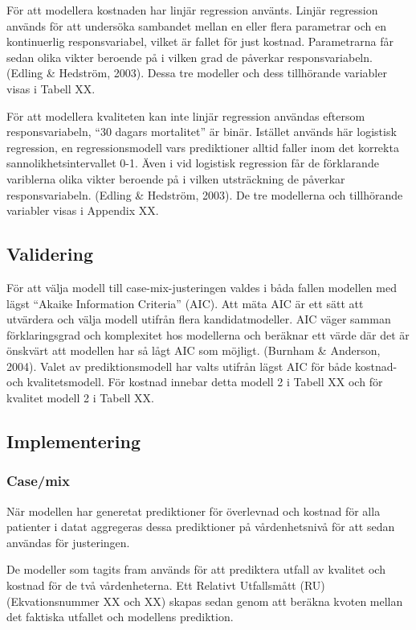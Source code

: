 För att modellera kostnaden har linjär regression använts. Linjär regression används för att undersöka sambandet mellan en eller flera parametrar och en kontinuerlig responsvariabel, vilket är fallet för just kostnad. Parametrarna får sedan olika vikter beroende på i vilken grad de påverkar responsvariabeln. (Edling \& Hedström, 2003). Dessa tre modeller och dess tillhörande variabler visas i Tabell XX.

För att modellera kvaliteten kan inte linjär regression användas eftersom responsvariabeln, “30 dagars mortalitet” är binär. Istället används här logistisk regression, en regressionsmodell vars prediktioner alltid faller inom det korrekta sannolikhetsintervallet 0-1. Även i vid logistisk regression får de förklarande variblerna olika vikter beroende på i vilken utsträckning de påverkar responsvariabeln. (Edling \& Hedström, 2003). De tre modellerna och tillhörande variabler visas i Appendix XX. 

\subsection{Validering}

För att välja modell till case-mix-justeringen valdes i båda fallen modellen med lägst “Akaike Information Criteria” (AIC). Att mäta AIC är ett sätt att utvärdera och välja modell utifrån flera kandidatmodeller. AIC väger samman förklaringsgrad och komplexitet hos modellerna och beräknar ett värde där det är önskvärt att modellen har så lågt AIC som möjligt.
(Burnham \& Anderson, 2004). Valet av prediktionsmodell har valts utifrån lägst AIC för både kostnad- och kvalitetsmodell. För kostnad innebar detta modell 2 i Tabell XX och för kvalitet modell 2 i Tabell XX.

\subsection{Implementering}

\subsubsection{Case/mix}

När modellen har generetat prediktioner för överlevnad och kostnad för alla patienter i datat aggregeras dessa prediktioner på vårdenhetsnivå för att sedan användas för justeringen. 

De modeller som tagits fram används för att prediktera utfall av kvalitet och kostnad för de två vårdenheterna. Ett Relativt Utfallsmått (RU) (Ekvationsnummer XX och XX) skapas sedan genom att beräkna kvoten mellan det faktiska utfallet och modellens prediktion.

